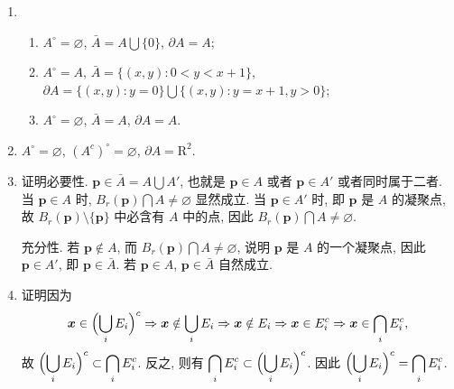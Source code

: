 % 
\begin{enumerate}
    \item %
        \begin{enumerate}[(1)]
            \item $A^\circ = \varnothing$, $\bar A = A \bigcup \{0\}$, $\partial A = A$;
            \item $A^\circ = A$, $\bar A = \{(x, y) : 0 < y < x + 1\}$, $\partial A = \{(x, y) : y = 0\} \bigcup \{(x, y) : y = x + 1, y > 0\}$;
            \item $A^\circ = \varnothing$, $\bar A = A$, $\partial A = A$.
        \end{enumerate}
    \item %
        $A^\circ = \varnothing$, $(A^c)^\circ = \varnothing$, $\partial A = \mathrm{R}^2$.
    \item %
        {\heiti 证明}\quad 必要性. $\boldsymbol{p} \in \bar A = A \bigcup A'$, 也就是 $\boldsymbol{p} \in A$ 或者 $\boldsymbol{p} \in A'$ 或者同时属于二者.
        当 $\boldsymbol{p} \in A$ 时, $B_r(\boldsymbol{p}) \bigcap A \neq \varnothing$ 显然成立. 当 $\boldsymbol{p} \in A'$ 时, 即 $\boldsymbol{p}$ 是 $A$ 的凝聚点,
        故 $B_r(\boldsymbol{p}) \setminus \{\boldsymbol{p}\}$ 中必含有 $A$ 中的点, 因此 $B_r(\boldsymbol{p}) \bigcap A \neq \varnothing$.

        充分性. 若 $\boldsymbol{p} \notin A$, 而 $B_r(\boldsymbol{p}) \bigcap A \neq \varnothing$, 说明 $\boldsymbol{p}$ 是 $A$ 的一个凝聚点, 因此 $\boldsymbol{p} \in A'$, 即 $\boldsymbol{p} \in \bar{A}$.
        若 $\boldsymbol{p} \in A$, $\boldsymbol{p} \in \bar A$ 自然成立. 
    \item %
        {\heiti 证明}\quad 因为
        \[
            \boldsymbol{x} \in \Bigl(\bigcup_i E_i\Bigr)^c \Rightarrow \boldsymbol{x} \notin \bigcup_i E_i
            \Rightarrow \boldsymbol{x} \notin E_i \Rightarrow \boldsymbol{x} \in E_i^c
            \Rightarrow \boldsymbol{x} \in \bigcap_i E_i^c,    
        \]
        故 $\displaystyle{\Bigl(\bigcup_i E_i\Bigr)^c \subset \bigcap_i E_i^c}$. 反之, 则有 $\displaystyle{\bigcap_i E_i^c \subset \Bigl(\bigcup_i E_i\Bigr)^c}$.
        因此 $\displaystyle{\Bigl(\bigcup_i E_i\Bigr)^c = \bigcap_i E_i^c}$.
        

\end{enumerate}
